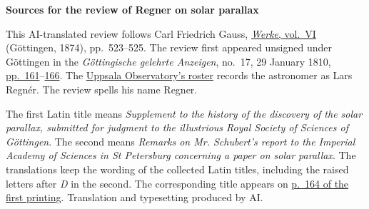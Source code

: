 \clearpage\thispagestyle{empty}
\begin{center}\textbf{Sources for the review of Regner on solar parallax}\end{center}
\noindent This AI-translated review follows Carl Friedrich Gauss, \href{https://gdz.sub.uni-goettingen.de/id/PPN236007467}{\emph{Werke}, vol.~VI} (Göttingen, 1874), pp.~523–525. The review first appeared unsigned under Göttingen in the \emph{Göttingische gelehrte Anzeigen}, no.~17, 29 January 1810, \href{https://images.p.sub.uni-goettingen.de/iiif/image/gdz:PPN319721507_1810:00000193/full/1650,/0/default.jpg}{pp.~161}–\href{https://images.p.sub.uni-goettingen.de/iiif/image/gdz:PPN319721507_1810:00000198/full/1650,/0/default.jpg}{166}. The \href{https://www.astro.uu.se/history/profflist_eng.html}{Uppsala Observatory’s roster} records the astronomer as Lars Regnér. The review spells his name Regner.

\noindent The first Latin title means \emph{Supplement to the history of the discovery of the solar parallax, submitted for judgment to the illustrious Royal Society of Sciences of Göttingen}. The second means \emph{Remarks on Mr. Schubert’s report to the Imperial Academy of Sciences in St Petersburg concerning a paper on solar parallax}. The translations keep the wording of the collected Latin titles, including the raised letters after \emph{D} in the second. The corresponding title appears on \href{https://images.p.sub.uni-goettingen.de/iiif/image/gdz:PPN319721507_1810:00000196/full/1650,/0/default.jpg}{p.~164 of the first printing}. Translation and typesetting produced by AI.
\clearpage
